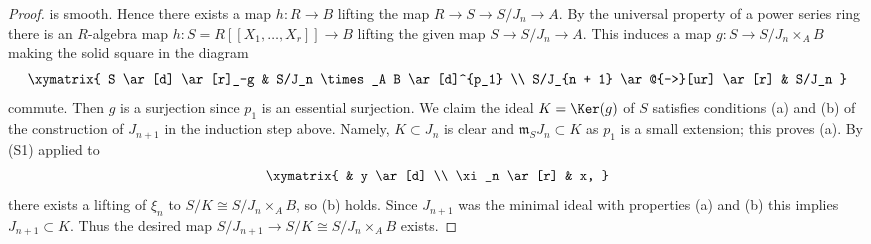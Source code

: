 \begin{proof}
is smooth. Hence there exists a map $h : R \to B$ lifting the map
$R \to S \to S/J_n \to A$. By the universal property of a power series
ring there is an $R$-algebra map $h : S = R[[X_1, \ldots, X_r]] \to B$
lifting the given map $S \to S/J_n \to A$. This induces a map
$g: S \to S/J_n \times_A B$ making the solid square in the diagram
$$
\xymatrix{
S \ar[d] \ar[r]_-g  &  S/J_n \times_A B \ar[d]^{p_1} \\
S/J_{n + 1} \ar@{-->}[ur] \ar[r] &  S/J_n
}
$$
commute. Then $g$ is a surjection since $p_1$ is an essential surjection.
We claim the ideal $K = \Ker(g)$ of $S$ satisfies conditions (a) and
(b) of the construction of $J_{n + 1}$ in the induction step above.
Namely, $K \subset J_n$ is clear and $\mathfrak m_SJ_n \subset K$ as $p_1$
is a small extension; this proves (a). By (S1) applied to
$$
\xymatrix{
            &  y \ar[d] \\
\xi_n \ar[r]  &  x,
}
$$
there exists a lifting of $\xi_n$ to $S/K \cong S/J_n \times_A B$, so (b)
holds. Since $J_{n + 1}$ was the minimal ideal with properties (a) and (b)
this implies $J_{n + 1} \subset K$. Thus the desired map
$S/J_{n+1} \to S/K \cong S/J_n \times_A B$ exists.
\end{proof}